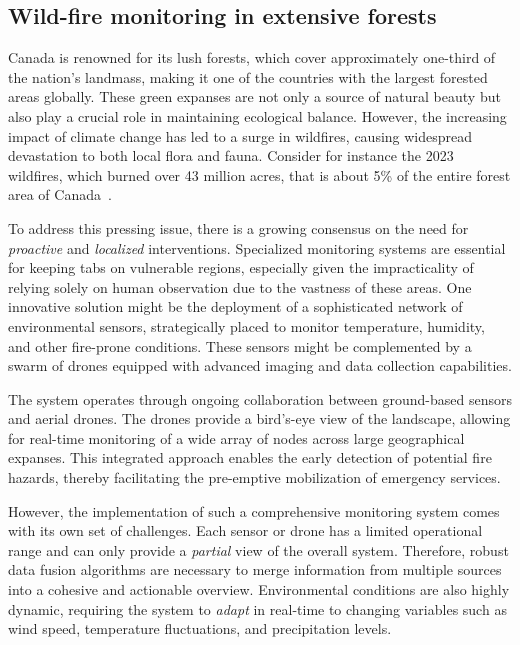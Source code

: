\subsection{Wild-fire monitoring in extensive forests}
Canada is renowned for its lush forests, 
 which cover approximately one-third of the nation's landmass, 
 making it one of the countries with the largest forested areas globally. 
These green expanses are not only a source of natural beauty but also play a crucial role in maintaining ecological balance. 
 However, the increasing impact of climate change has led to a surge in wildfires, 
 causing widespread devastation to both local flora and fauna.
 Consider for instance the 2023 wildfires, 
 which burned over 43 million acres, 
 that is about 5\% of the entire forest area of Canada~\cite{enwiki:1178342069}. 

To address this pressing issue, 
 there is a growing consensus on the need for \emph{proactive} and \emph{localized} interventions. 
 Specialized monitoring systems are essential for keeping tabs on vulnerable regions, 
 especially given the impracticality of relying solely on human observation due to the vastness of these areas. 
 One innovative solution might be the deployment of a sophisticated network of environmental sensors, 
 strategically placed to monitor temperature, humidity, and other fire-prone conditions. 
 These sensors might be complemented by a swarm of drones equipped with advanced imaging and data collection capabilities.

The system operates through ongoing collaboration between ground-based sensors and aerial drones. 
 The drones provide a bird's-eye view of the landscape, 
 allowing for real-time monitoring of a wide array of nodes across large geographical expanses. 
 This integrated approach enables the early detection of potential fire hazards, 
 thereby facilitating the pre-emptive mobilization of emergency services.

\sloppypar
However, the implementation of such a comprehensive monitoring system comes with its own set of challenges. 
 Each sensor or drone has a limited operational range and can only provide a \emph{partial} view of the overall system. 
 Therefore, robust data fusion algorithms are necessary to merge information from multiple sources into a cohesive and actionable overview. 
 Environmental conditions are also highly dynamic, requiring the system to \emph{adapt} in real-time to changing variables such as wind speed, temperature fluctuations, and precipitation levels.


